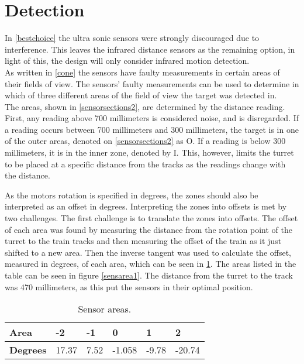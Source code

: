\section{Detection}\label{sec:dessensor}
In \cref{bestchoice} the ultra sonic sensors were strongly discouraged due to interference. This leaves the infrared distance sensors as the remaining option, in light of this, the design will only consider infrared motion detection. \\

As written in \cref{cone} the sensors have faulty measurements in certain areas of their fields of view. The sensors' faulty measurements can be used to determine in which of three different areas of the field of view the target was detected in. \\

The areas, shown in \cref{sensorsections2}, are determined by the distance reading. First, any reading above 700 millimeters is considered noise, and is disregarded. If a reading occurs between 700 millimeters and 300 millimeters, the target is in one of the outer areas, denoted on \cref{sensorsections2} as O. If a reading is below 300 millimeters, it is in the inner zone, denoted by I. This, however, limits the turret to be placed at a specific distance from the tracks as the readings change with the distance.



As the motors rotation is specified in degrees, the zones should also be interpreted as an offset in degrees. Interpreting the zones into offsets is met by two challenges. The first challenge is to translate the zones into offsets. The offset of each area was found by measuring the distance from the rotation point of the turret to the train tracks and then measuring the offset of the train as it just shifted to a new area. Then the inverse tangent was used to calculate the offset, measured in degrees, of each area, which can be seen in \cref{areas}. The areas listed in the table can be seen in figure \cref{sensarea1}. The distance from the turret to the track was 470 millimeters, as this put the sensors in their optimal position.

\begin{table}[H]
\centering
\begin{tabular}{|l|l|l|l|l|l|}
\hline
\textbf{Area}   & -2     & -1    & 0    & 1    & 2     \\ \hline
\textbf{Degrees} & 17.37 & 7.52 & -1.058 & -9.78 & -20.74 \\ \hline
\end{tabular}
\caption{Sensor areas.}
\label{areas}
\end{table}


